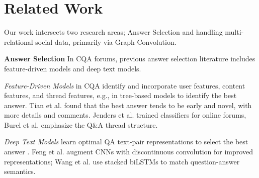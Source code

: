 \section{Related Work}
\label{sec:related}
Our work intersects two research areas; Answer Selection and handling multi-relational social data, primarily via Graph Convolution.

\noindent
\textbf{Answer Selection}
In CQA forums, previous answer selection literature includes feature-driven models and deep text models.

\noindent
\emph{Feature-Driven Models} in CQA identify and incorporate user features, content features, and thread features, e.g., in tree-based models to identify the best answer. Tian et al. \cite{TianZL13} found that the best answer tends to be early and novel, with more details and comments. Jenders et al. \cite{JendersKN16} trained classifiers for online forums, Burel et al. \cite{BurelMA16} emphasize the Q\&A thread structure.  %




\noindent
\emph{Deep Text Models} learn optimal QA text-pair representations to select the best answer \cite{ZhangLSW17,WuWS18,WangN15}. Feng et al. \cite{FengXGWZ15} augment CNNs with discontinuous convolution for improved representations; Wang et al. \cite{Tan2015} use stacked biLSTMs to match question-answer semantics.




